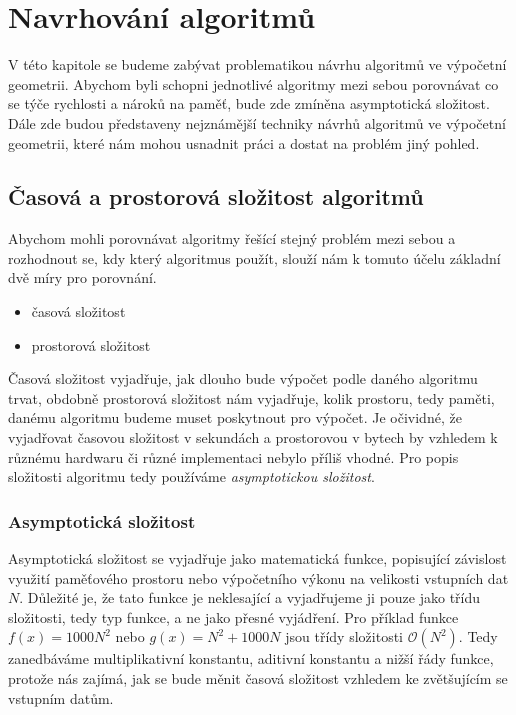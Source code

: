 \chapter{Navrhování algoritmů}
\label{chap:navrhovanialgoritmu}
V této kapitole se budeme zabývat problematikou návrhu algoritmů ve
výpočetní geometrii. Abychom byli schopni jednotlivé algoritmy mezi
sebou porovnávat co se týče rychlosti a nároků na paměť, bude zde
zmíněna asymptotická složitost. Dále zde budou představeny nejznámější
techniky návrhů algoritmů ve výpočetní geometrii, které nám mohou
usnadnit práci a dostat na problém jiný pohled.

\section{Časová a prostorová složitost algoritmů}
Abychom mohli porovnávat algoritmy řešící stejný problém mezi sebou a
rozhodnout se, kdy který algoritmus použít, slouží nám k tomuto účelu
základní dvě míry pro porovnání.
\begin{itemize}
	\item časová složitost
	\item prostorová složitost
\end{itemize}
Časová složitost vyjadřuje, jak dlouho bude výpočet podle daného
algoritmu trvat, obdobně prostorová složitost nám vyjadřuje, kolik
prostoru, tedy paměti, danému algoritmu budeme muset poskytnout pro
výpočet. Je očividné, že vyjadřovat časovou složitost v sekundách a
prostorovou v bytech by vzhledem k různému hardwaru či různé
implementaci nebylo příliš vhodné. Pro popis složitosti algoritmu tedy
používáme \textit{asymptotickou složitost}.
	
\subsection{Asymptotická složitost}
Asymptotická složitost se vyjadřuje jako matematická funkce,
popisující závislost využití paměťového prostoru nebo výpočetního
výkonu na velikosti vstupních dat $N$. Důležité je, že tato funkce je
neklesající a vyjadřujeme ji pouze jako třídu složitosti, tedy typ
funkce, a ne jako přesné vyjádření. Pro příklad funkce $f(x)=1000N^2$
nebo $g(x)=N^2 + 1000N$ jsou třídy složitosti $\mathcal{O}
(N^2)$. Tedy zanedbáváme multiplikativní konstantu, aditivní konstantu
a nižší řády funkce, protože nás zajímá, jak se bude měnit časová
složitost vzhledem ke zvětšujícím se vstupním datům.
	
